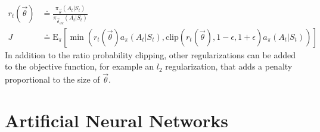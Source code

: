\begin{align}
	r_t(\vec{\theta}) &\doteq \frac{\pi_{\vec{\theta}}(A_t \vert S_t)}{\pi_{\vec{\theta}_{old}} (A_t \vert S_t)} \\
	J &\doteq \mathrm{E}_\pi \left[\min \left(r_t(\vec{\theta}) a_\pi(A_t \vert S_t), \mathrm{clip}(r_t(\vec{\theta}), 1- \epsilon, 1+\epsilon) a_\pi(A_t \vert S_t) \right) \right] \label{eq:object_ppo}
\end{align}
In addition to the ratio probability clipping, other regularizations can be added to the objective function, for example an $l_2$ regularization, that adds a penalty proportional to the size of $\vec{\theta}$.



\section{Artificial Neural Networks}